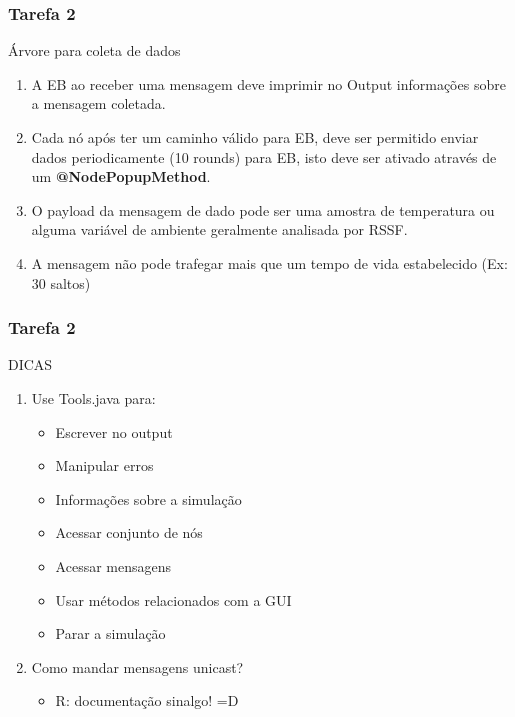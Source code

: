 \documentclass{beamer}
\begin{document}
\begin{frame}
	\frametitle{Tarefa 2}
	\begin{alertblock}{Árvore para coleta de dados}
		\begin{enumerate}
			
			\item A EB ao receber uma mensagem deve imprimir no Output informações sobre a mensagem coletada.
				
			\item Cada nó após ter um caminho válido para EB, deve ser permitido enviar dados periodicamente (10 rounds) para EB, isto deve ser ativado através de um \textbf{@NodePopupMethod}.  

			\item O payload da mensagem de dado pode ser uma amostra de temperatura ou alguma variável de ambiente geralmente analisada por RSSF.
			
			\item A mensagem não pode trafegar mais que um tempo de vida estabelecido (Ex: 30 saltos)
		\end{enumerate}
	\end{alertblock}
\end{frame}

\begin{frame}
	\frametitle{Tarefa 2}
	\begin{block}{DICAS}
		\begin{enumerate}
			\item Use Tools.java para:
			\begin{itemize}
				\item Escrever no output
				\item Manipular erros
				\item Informações sobre a simulação
				\item Acessar conjunto de nós
				\item Acessar mensagens
				\item Usar métodos relacionados com a GUI
				\item Parar a simulação
			\end{itemize}
			\item Como mandar mensagens unicast? 
			\begin{itemize}
				\item R: documentação sinalgo! =D
			\end{itemize}
		\end{enumerate}
	\end{block}
\end{frame}
\end{document}
